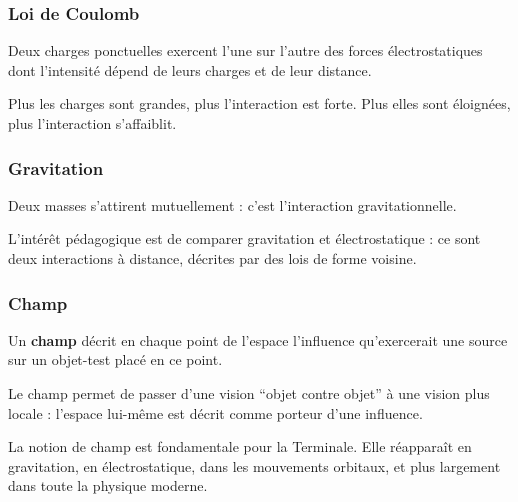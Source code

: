\documentclass[11pt,a4paper]{article}
\begin{document}
\subsubsection{Loi de Coulomb}

\begin{proprbox}
Deux charges ponctuelles exercent l'une sur l'autre des forces électrostatiques dont l'intensité dépend de leurs charges et de leur distance.
\end{proprbox}

\begin{sensbox}
Plus les charges sont grandes, plus l'interaction est forte.  
Plus elles sont éloignées, plus l'interaction s'affaiblit.
\end{sensbox}

\subsubsection{Gravitation}

\begin{proprbox}
Deux masses s'attirent mutuellement : c'est l'interaction gravitationnelle.
\end{proprbox}

\begin{sensbox}
L'intérêt pédagogique est de comparer gravitation et électrostatique : ce sont deux interactions à distance, décrites par des lois de forme voisine.
\end{sensbox}

\subsubsection{Champ}

\begin{definitionbox}
Un \textbf{champ} décrit en chaque point de l'espace l'influence qu'exercerait une source sur un objet-test placé en ce point.
\end{definitionbox}

\begin{sensbox}
Le champ permet de passer d'une vision ``objet contre objet'' à une vision plus locale : l'espace lui-même est décrit comme porteur d'une influence.
\end{sensbox}

\begin{terminalebox}
La notion de champ est fondamentale pour la Terminale.  
Elle réapparaît en gravitation, en électrostatique, dans les mouvements orbitaux, et plus largement dans toute la physique moderne.
\end{terminalebox}
\end{document}
